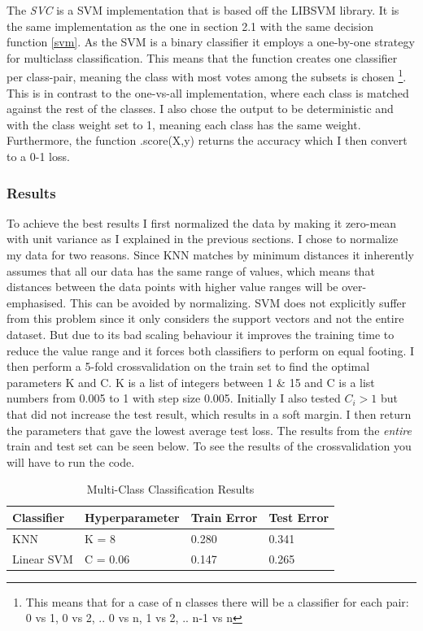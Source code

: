 \documentclass{article}
\theoremstyle{plain}
\theoremstyle{nonumberplain}
\begin{document}
The \textit{SVC}\cite{website:svm-sklearn} is a SVM implementation that is based off the LIBSVM \cite{website:libsvm} library. 
It is the same implementation as the one in section 2.1 with the same decision function \eqref{svm}. 
As the SVM is a binary classifier it employs a one-by-one strategy for multiclass classification. This means that the function creates one classifier per class-pair, meaning the class with most votes among the subsets is chosen
\footnote[1]{This means that for a case of n classes there will be a classifier for each pair: 0 vs 1, 0 vs 2, .. 0 vs n, 1 vs 2, .. n-1 vs n}.
This is in contrast to the one-vs-all implementation, where each class is matched against the rest of the classes. I also chose the output to be deterministic and with the class weight set to 1, meaning each class has the same weight. Furthermore, the function .score(X,y) returns the accuracy  which I then convert to a 0-1 loss.

\subsubsection{Results}
To achieve the best results I first normalized the data by making it zero-mean with unit variance as I explained in the previous sections.
I chose to normalize my data for two reasons. 
Since KNN matches by minimum distances it inherently assumes that all our data has the same range of values, which means that distances between the data points with higher value ranges will be over-emphasised. This can be avoided by normalizing. 
SVM does not explicitly suffer from this problem since it only considers the support vectors and not the entire dataset. 
But due to its bad scaling behaviour it improves the training time to reduce the value range and it forces both classifiers to perform on equal footing.
I then perform a 5-fold crossvalidation on the train set to find the optimal parameters K and C.
K is a list of integers between 1 \& 15 and C is a list numbers from 0.005 to 1 with step size 0.005. 
Initially I also tested $C_i > 1$ but that did not increase the test result, which results in a soft margin.
I then return the parameters that gave the lowest average test loss.
The results from the \textit{entire} train and test set can be seen below. 
To see the results of the crossvalidation you will have to run the code.

\begin{table}[h!]
\centering
\caption{Multi-Class Classification Results}
\label{table:multiclass}
\begin{tabular}{ l | l  l  l }
	\hline \hline
  Classifier & Hyperparameter & Train Error & Test Error \\ [0.5ex]
  	\hline
  KNN & K = 8 & 0.280 & 0.341 \\
  Linear SVM & C = 0.06 & 0.147 & 0.265 \\
  \hline
\end{tabular}
\end{table}
\end{document}
